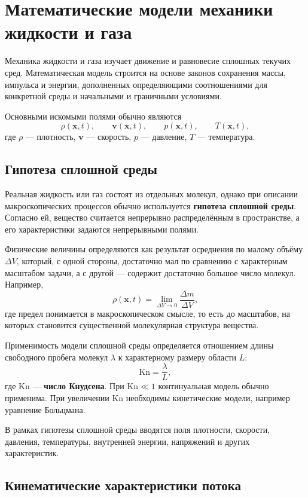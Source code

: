 \section{Математические модели механики жидкости и газа}

Механика жидкости и газа изучает движение и равновесие сплошных текучих сред. Математическая модель строится на основе законов сохранения массы, импульса и энергии, дополненных определяющими соотношениями для конкретной среды и начальными и граничными условиями.

Основными искомыми полями обычно являются
\[
\rho(\mathbf{x},t), \qquad
\mathbf{v}(\mathbf{x},t), \qquad
p(\mathbf{x},t), \qquad
T(\mathbf{x},t),
\]
где $\rho$ --- плотность, $\mathbf{v}$ --- скорость, $p$ --- давление,
$T$ --- температура.

\subsection{Гипотеза сплошной среды}

Реальная жидкость или газ состоят из отдельных молекул, однако при описании макроскопических процессов обычно используется \textbf{гипотеза сплошной среды}. Согласно ей, вещество считается непрерывно распределённым в пространстве, а его характеристики задаются непрерывными полями.

Физические величины определяются как результат осреднения по малому объёму $\Delta V$, который, с одной стороны, достаточно мал по сравнению с характерным масштабом задачи, а с другой --- содержит достаточно большое число молекул. Например,
\[
\rho(\mathbf{x},t)
=
\lim_{\Delta V\to 0}
\frac{\Delta m}{\Delta V},
\]
где предел понимается в макроскопическом смысле, то есть до масштабов, на которых становится существенной молекулярная структура вещества.

Применимость модели сплошной среды определяется отношением длины свободного пробега молекул $\lambda$ к характерному размеру области $L$:
\[
\mathrm{Kn}=\frac{\lambda}{L},
\]
где $\mathrm{Kn}$ --- \textbf{число Кнудсена}. При $\mathrm{Kn}\ll 1$ континуальная модель обычно применима. При увеличении $\mathrm{Kn}$ необходимы кинетические модели, например уравнение Больцмана.

В рамках гипотезы сплошной среды вводятся поля плотности, скорости, давления, температуры, внутренней энергии, напряжений и других характеристик.

\subsection{Кинематические характеристики потока}

